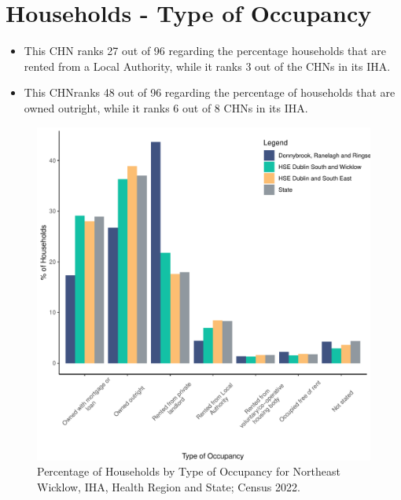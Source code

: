 \documentclass{article}
\begin{document}
\section{Households - Type of Occupancy}\label{sect:Households}
\begin{itemize}
\item This CHN ranks  27 out of 96 regarding the percentage households that are rented from a Local Authority, while it ranks  3 out of the CHNs in its IHA. 
\item This CHNranks  48 out of 96 regarding the percentage of households that are owned outright, while it ranks   6 out of 8 CHNs in its IHA.
\end{itemize}
\begin{figure}[H]
	\centering
	\includegraphics[width = 140mm]{../figures/HouseholdsED.pdf}
	\caption{Percentage of Households by Type of Occupancy for Northeast Wicklow, IHA, Health Region and State; Census 2022.}
	\label{fig:vbnv}
	\end{figure}
\end{document}
